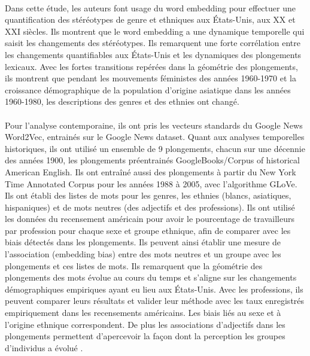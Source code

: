 \documentclass{article}
\begin{document}
\paragraph{}
Dans cette étude, les auteurs font usage du word embedding pour effectuer une quantification des stéréotypes de genre et ethniques aux États-Unis, aux XX et XXI siècles. Ils montrent que le word embedding a une dynamique temporelle qui saisit les changements des stéréotypes. Ils remarquent une forte corrélation entre les changements quantifiables aux États-Unis et les dynamiques des plongements lexicaux. Avec les fortes transitions repérées dans la géométrie des plongements, ils montrent que pendant les mouvements féministes des années 1960-1970 et la croissance démographique de la population d’origine asiatique dans les années 1960-1980, les descriptions des genres et des ethnies ont changé.
\paragraph{}
Pour l’analyse contemporaine, ils ont pris les vecteurs standards du Google News Word2Vec, entrainés sur le Google News dataset. Quant aux analyses temporelles historiques, ils ont utilisé un ensemble de 9 plongements, chacun sur une décennie des années 1900, les plongements préentrainés GoogleBooks/Corpus of historical American English. Ils ont entraîné aussi des plongements à partir du New York Time Annotated Corpus pour les années 1988 à 2005, avec l’algorithme GLoVe. Ils ont établi des listes de mots pour les genres, les ethnies (blancs, asiatiques, hispaniques) et de mots neutres (des adjectifs et des professions). Ils ont utilisé les données du recensement américain pour avoir le pourcentage de travailleurs par profession pour chaque sexe et groupe ethnique, afin de comparer avec les biais détectés dans les plongements. Ils peuvent ainsi établir une mesure de l’association (embedding bias) entre des mots neutres et un groupe avec les plongements et ces listes de mots. Ils remarquent que la géométrie des plongements des mots évolue au cours du temps et s’aligne sur les changements démographiques empiriques ayant eu lieu aux États-Unis. Avec les professions, ils peuvent comparer leurs résultats et valider leur méthode avec les taux enregistrés empiriquement dans les recensements américains. Les biais liés au sexe et à l’origine ethnique correspondent. De plus les associations d’adjectifs dans les plongements permettent d’apercevoir la façon dont la perception les groupes d’individus a évolué \cite{garg2018word}.
\end{document}
